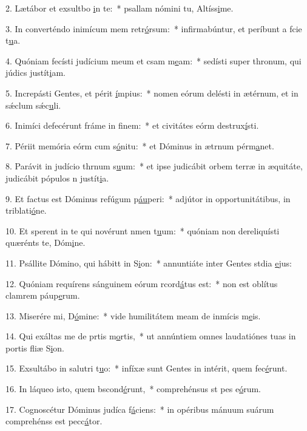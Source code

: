 2. Lætábor et exsultbo \uline{i}n te:~* psallam nómini tu, Altíss\uline{i}me.\par 
3. In converténdo inimícum mem retr\uline{ó}rsum:~* infirmabúntur, et períbunt a fcie t\uline{u}a.\par 
4. Quóniam fecísti judícium meum et csam m\uline{e}am:~* sedísti super thronum, qui júdics justít\uline{i}am.\par 
5. Increpásti Gentes, et périt \uline{í}mpius:~* nomen eórum delésti in ætérnum, et in sǽclum sǽc\uline{u}li.\par 
6. Inimíci defecérunt fráme in f\uline{i}nem:~* et civitátes eórm destrux\uline{í}sti.\par 
7. Périit memória eórm cum s\uline{ó}nitu:~* et Dóminus in ætrnum pérm\uline{a}net.\par 
8. Parávit in judício thrnum s\uline{u}um:~* et ipse judicábit orbem terræ in æquitáte, judicábit pópulos n justít\uline{i}a.\par 
9. Et factus est Dóminus refúgum p\uline{áu}peri:~* adjútor in opportunitátibus, in triblati\uline{ó}ne.\par 
10. Et sperent in te qui novérunt nmen t\uline{u}um:~* quóniam non dereliquísti quærénts te, Dóm\uline{i}ne.\par 
11. Psállite Dómino, qui hábitt in S\uline{i}on:~* annuntiáte inter Gentes stdia \uline{e}jus:\par 
12. Quóniam requírens sánguinem eórum rcord\uline{á}tus est:~* non est oblítus clamrem páup\uline{e}rum.\par 
13. Miserére mi, D\uline{ó}mine:~* vide humilitátem meam de inmícis m\uline{e}is.\par 
14. Qui exáltas me de prtis m\uline{o}rtis,~* ut annúntiem omnes laudatiónes tuas in portis fliæ S\uline{i}on.\par 
15. Exsultábo in salutri t\uline{u}o:~* infíxæ sunt Gentes in intérit, quem fec\uline{é}runt.\par 
16. In láqueo isto, quem bscond\uline{é}runt,~* comprehénsus st pes e\uline{ó}rum.\par 
17. Cognoscétur Dóminus judíca f\uline{á}ciens:~* in opéribus mánuum suárum comprehénss est pecc\uline{á}tor.\par 
